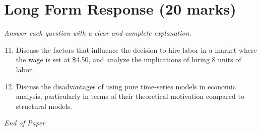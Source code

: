 \documentclass[12pt]{article}
\begin{document}
\section*{Long Form Response (20 marks)}
\textit{Answer each question with a clear and complete explanation.}
\begin{enumerate}[label=\arabic*.]
\setcounter{enumi}{10}
\item Discuss the factors that influence the decision to hire labor in a market where the wage is set at \$4.50, and analyze the implications of hiring 8 units of labor.
\item Discuss the disadvantages of using pure time-series models in economic analysis, particularly in terms of their theoretical motivation compared to structural models.
\end{enumerate}

\vfill
\noindent\textit{End of Paper}
\end{document}
